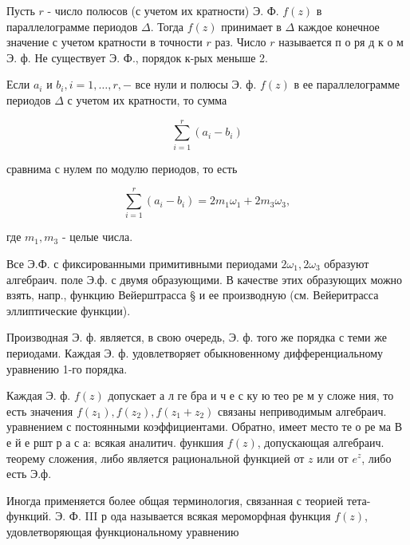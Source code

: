 \documentclass[10pt]{article}
\begin{document}
Пусть $r$ - число полюсов (с учетом их кратности) Э. Ф. $f(z)$ в параллелограмме периодов $\Delta$. Тогда $f(z)$ принимает в $\Delta$ каждое конечное значение с учетом кратности в точности $r$ раз. Число $r$ называется п о ря д к о м Э. ф. Не существует Э. Ф., порядок к-рых меныше 2.



Если $a_{i}$ и $b_{i}, i=1, \ldots, r,-$ все нули и полюсы Э. ф. $f(z)$ в ее параллелограмме периодов $\Delta$ с учетом их кратности, то сумма



\[

\sum_{i=1}^{r}\left(a_{i}-b_{i}\right)

\]



сравнима с нулем по модулю периодов, то есть



\[

\sum_{i=1}^{r}\left(a_{i}-b_{i}\right)=2 m_{1} \omega_{1}+2 m_{3} \omega_{3},

\]



где $m_{1}, m_{3}$ - целые числа.



Все Э.Ф. с фиксированными примитивными периодами $2 \omega_{1}, 2 \omega_{3}$ образуют алгебраич. поле Э.ф. с двумя образующими. В качестве этих образующих можно взять, напр., функцию Вейерштрасса § и ее производную (см. Вейеритрасса эллиптические функции).



Производная Э. ф. является, в свою очередь, Э. ф. того же порядка с теми же периодами. Каждая Э. ф. удовлетворяет обыкновенному дифференциальному уравнению 1-го порядка.



Каждая Э. ф. $f(z)$ допускает а л ге бра и ч е с ку ю тео ре м у сложе ния, то есть значения $f\left(z_{1}\right), f\left(z_{2}\right), f\left(z_{1}+z_{2}\right)$ связаны неприводимым алгебраич. уравнением с постоянными коэффициентами. Обратно, имеет место те о ре ма В е й е ршт р а с а: всякая аналитич. функшия $f(z)$, допускающая алгебраич. теорему сложения, либо является рациональной функцией от $z$ или от $e^{z}$, либо есть Э.ф.



Иногда применяется более общая терминология, связанная с теорией тета-функций. Э. Ф. III р ода называется всякая мероморфная функция $f(z)$, удовлетворяющая функциональному уравнению
\end{document}
